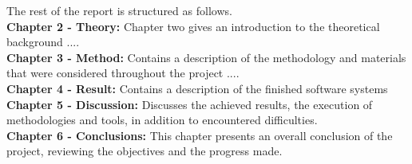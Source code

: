 The rest of the report is structured as follows.\\
\break
\textbf{Chapter 2 - Theory:} Chapter two gives an introduction to the theoretical background .... \\
\break
\textbf{Chapter 3 - Method:} Contains a description of the methodology and materials that were considered throughout the project ....\\
\break
\textbf{Chapter 4 - Result:} Contains a description of the finished software systems \\
\break
\textbf{Chapter 5 - Discussion:} Discusses the achieved results, the execution of methodologies and tools, in addition to encountered difficulties.\\
\break
\textbf{Chapter 6 - Conclusions:} This chapter presents an overall conclusion of the project, reviewing the objectives and the progress made. \\